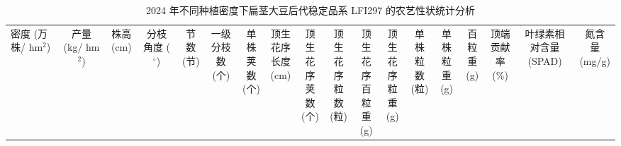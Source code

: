 \documentclass[UTF8,oneside,openany,driverfallback=dvipdfmx,pdfencoding=unicode,hidelinks]{jlutex}
\begin{document}
	\begin{table}
		\centering
		\caption{2024 年不同种植密度下扁茎大豆后代稳定品系 LFI297 的农艺性状统计分析}
		\label{tab:agri2024}
		\footnotesize %
		\setlength{\tabcolsep}{4pt} %
		\begin{tabular}{lccccccccccccccccc}
			\toprule
			\makecell[l]{密度\\(万株/\\hm$^2$)} & \makecell{产量\\(kg/\\hm$^2$)} & \makecell{株高\\(cm)} & \makecell{分枝\\角度\\($^\circ$)} & \makecell{节数\\(节)} & \makecell{一级\\分枝\\数(个)} & \makecell{单株\\荚数\\(个)} & \makecell{顶生\\花序\\长度\\(cm)} & \makecell{顶生\\花序\\荚数\\(个)} & \makecell{顶生\\花序\\粒数\\(粒)} & \makecell{顶生\\花序\\百粒\\重(g)} & \makecell{顶生\\花序\\粒重\\(g)} & \makecell{单株\\粒数\\(粒)} & \makecell{单株\\粒重\\(g)} & \makecell{百粒\\重\\(g)} & \makecell{顶端\\贡献\\率(\%)} & \makecell{叶绿素相对含量\\(SPAD)} & \makecell{氮含\\量\\(mg/g)} \\

\end{tabular}
\end{table}
\end{document}
